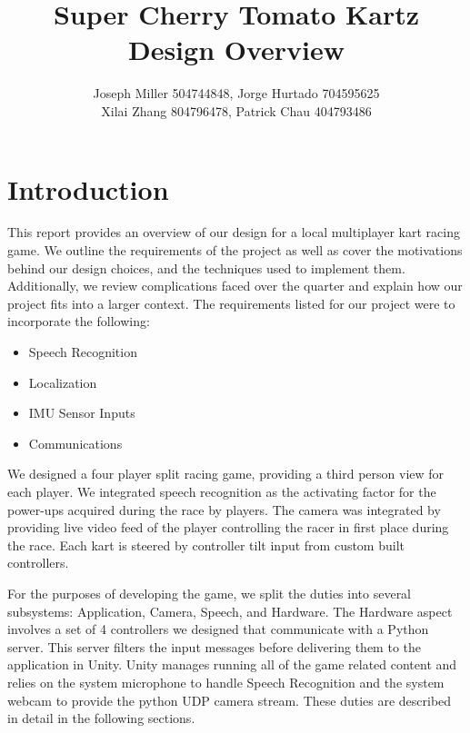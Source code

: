 \documentclass[a4paper,10pt]{article}
\begin{document}
%
   \title{Super Cherry Tomato Kartz Design Overview}

   \author{Joseph Miller 504744848, Jorge Hurtado 704595625 \\ Xilai Zhang 804796478, Patrick Chau 404793486}
          
   \date{}

   \maketitle
   
   \tableofcontents
 
  \newpage
   
\doublespacing

\section{Introduction}
This report provides an overview of our design for a local multiplayer kart racing game. We outline the requirements of the project as well as cover the motivations behind our design choices, and the techniques used to implement them. Additionally, we review complications faced over the quarter and explain how our project fits into a larger context. The requirements listed for our project were to incorporate the following: 

\singlespacing
\begin{itemize}
\item Speech Recognition
\item Localization
\item IMU Sensor Inputs
\item Communications
\end{itemize}

\doublespacing

\noindent
We designed a four player split racing game, providing a third person view for each player. We integrated speech recognition as the activating factor for the power-ups acquired during the race by players. The camera was integrated by providing live video feed of the player controlling the racer in first place during the race. Each kart is steered by controller tilt input from custom built controllers. 

For the purposes of developing the game, we split the duties into several subsystems: Application, Camera, Speech, and Hardware. The Hardware aspect involves a set of 4 controllers we designed that communicate with a Python server. This server filters the input messages before delivering them to the application in Unity. Unity manages running all of the game related content and relies on the system microphone to handle Speech Recognition and the system webcam to provide the python UDP camera stream. These duties are described in detail in the following sections.
\end{document}
